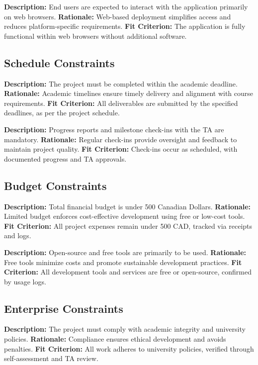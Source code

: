 \documentclass[12pt]{article}
\begin{document}
\textbf{Description:} End users are expected to interact with the application primarily on web browsers.
\textbf{Rationale:} Web-based deployment simplifies access and reduces platform-specific requirements.
\textbf{Fit Criterion:} The application is fully functional within web browsers without additional software.

\subsection{Schedule Constraints}

\textbf{Description:} The project must be completed within the academic deadline.
\textbf{Rationale:} Academic timelines ensure timely delivery and alignment with course requirements.
\textbf{Fit Criterion:} All deliverables are submitted by the specified deadlines, as per the project schedule.

\textbf{Description:} Progress reports and milestone check-ins with the TA are mandatory.
\textbf{Rationale:} Regular check-ins provide oversight and feedback to maintain project quality.
\textbf{Fit Criterion:} Check-ins occur as scheduled, with documented progress and TA approvals.

\subsection{Budget Constraints}

\textbf{Description:} Total financial budget is under 500 Canadian Dollars.
\textbf{Rationale:} Limited budget enforces cost-effective development using free or low-cost tools.
\textbf{Fit Criterion:} All project expenses remain under 500 CAD, tracked via receipts and logs.

\textbf{Description:} Open-source and free tools are primarily to be used.
\textbf{Rationale:} Free tools minimize costs and promote sustainable development practices.
\textbf{Fit Criterion:} All development tools and services are free or open-source, confirmed by usage logs.

\subsection{Enterprise Constraints}

\textbf{Description:} The project must comply with academic integrity and university policies.
\textbf{Rationale:} Compliance ensures ethical development and avoids penalties.
\textbf{Fit Criterion:} All work adheres to university policies, verified through self-assessment and TA review.
\end{document}
